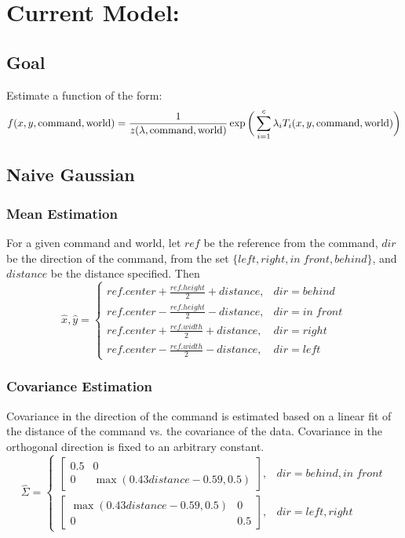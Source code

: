 \documentclass[12pt,letterpaper]{article}
\begin{document}
\section*{Current Model:}

\subsection{Goal}
Estimate a function of the form:
\[
f(x, y, \textmd{command}, \textmd{world}) = \frac{1}{z(\lambda, \textmd{command}, \textmd{world})}\exp\bigg(\sum_{i = 1}^c \lambda_iT_i(x, y, \textmd{command}, \textmd{world})\bigg)
\]

\subsection{Naive Gaussian}
\subsubsection*{Mean Estimation}
For a given command and world, let $ref$ be the reference from the command, $dir$ be the direction of the command, from the set $\{left, right, in\;front, behind\}$, and $distance$ be the distance specified. Then
\[
\hat{x}, \hat{y} = \begin{cases} ref.center + \frac{ref.height}{2} + distance, & dir = behind \\
ref.center - \frac{ref.height}{2} - distance, & dir = in\;front \\
 ref.center + \frac{ref.width}{2} + distance, & dir = right \\
 ref.center - \frac{ref.width}{2} - distance, & dir = left \end{cases}
\]

\subsubsection*{Covariance Estimation}
Covariance in the direction of the command is estimated based on a linear fit of the distance of the command vs. the covariance of the data. Covariance in the orthogonal direction is fixed to an arbitrary constant.
\[
\hat{\Sigma} = \begin{cases}
\begin{bmatrix} 0.5 & 0 \\ 0 & \max(0.43distance - 0.59, 0.5) \end{bmatrix}, & dir = behind, in\;front\\
\begin{bmatrix} \max(0.43distance - 0.59, 0.5) & 0 \\ 0 & 0.5 \end{bmatrix}, & dir = left, right
\end{cases}
\]
\end{document}
